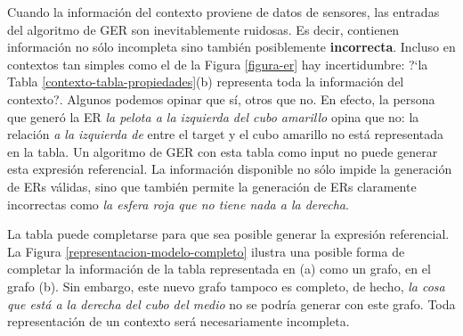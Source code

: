 Cuando la informaci\'on del contexto proviene de datos de sensores, las entradas del algoritmo de GER son inevitablemente ruidosas. Es decir, 
contienen informaci\'on no s\'olo incompleta sino tambi\'en posiblemente {\bf incorrecta}. Incluso en contextos tan simples como el de la 
Figura \ref{figura-er} hay incertidumbre: ?`la Tabla \ref{contexto-tabla-propiedades}(b) representa toda la informaci\'on del 
contexto?. Algunos podemos opinar que s\'i, otros que no. En efecto, la persona que gener\'o la ER {\it la pelota a la izquierda del cubo amarillo} opina que no: la relaci\'on \emph{a la izquierda de} entre el target y el cubo amarillo no est\'a representada en la tabla. Un algoritmo de GER con esta tabla como input no puede generar esta expresi\'on referencial. La informaci\'on disponible no s\'olo impide la generaci\'on de ERs v\'alidas, sino que tambi\'en permite la generaci\'on de ERs claramente incorrectas como \emph{la esfera roja 
que no tiene nada a la derecha}.

La tabla puede completarse para que sea posible
generar la expresi\'on referencial. La Figura \ref{representacion-modelo-completo} ilustra una posible forma de completar la informaci\'on de la tabla representada en (a) como un grafo, en el grafo (b). Sin embargo, este nuevo grafo tampoco es completo, 
de hecho, {\it la cosa que est\'a a la derecha del cubo del medio} no se podr\'ia generar con este grafo. Toda representaci\'on de un contexto ser\'a necesariamente incompleta.
\medskip

